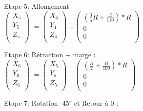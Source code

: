 Etape 5: Allongement \\

$
\begin{pmatrix}
  X_{5} \\
  Y_{5} \\
  Z_{5} \\
\end{pmatrix}
$
\vspace{5mm} %
$
=
\begin{pmatrix}
  X_{4} \\
  Y_{4} \\
  Z_{4} \\
\end{pmatrix}
$
\vspace{5mm} %
$
 +
\begin{pmatrix}
  (\frac{3}{5}R + \frac{13}{110})*R  \\
  0 \\
  0 \\
\end{pmatrix}
$

Etape 6: Rétraction + marge : \\

$
\begin{pmatrix}
  X_{6} \\
  Y_{6} \\
  Z_{6} \\
\end{pmatrix}
$
\vspace{5mm} %
$
=
\begin{pmatrix}
  X_{5} \\
  Y_{5} \\
  Z_{5} \\
\end{pmatrix}
$
\vspace{5mm} %
$
 +
\begin{pmatrix}
  (\frac{R}{2} + \frac{B}{100})*R  \\
  0 \\
  0 \\
\end{pmatrix}
$

Etape 7: Rotation -45° et Retour à 0 : \\

